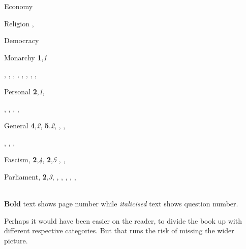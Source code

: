 \documentclass{book}
\begin{document}

\begin{theindex}
 \item Economy
  \subitem
 \item Religion
  ,
 \item Democracy
 \item Monarchy
     \subitem \textbf{1},\textit{1}

\textbf{},\textit{}
\textbf{},\textit{}
\textbf{},\textit{}
\textbf{},\textit{}
\textbf{},\textit{}
\textbf{},\textit{}
\textbf{},\textit{}
\textbf{},\textit{}
 \item Personal
     \subitem \textbf{2},\textit{1},

\textbf{},\textit{}
\textbf{},\textit{}
\textbf{},\textit{}
\textbf{},\textit{}
 \item General
     \subitem \textbf{4},\textit{2}, \textbf{5}.\textit{2},
\textbf{},\textit{}
\textbf{},\textit{}

\textbf{},\textit{}
\textbf{},\textit{}
\textbf{},\textit{}

 \item Fascism,
\subitem \textbf{2},\textit{4}, \textbf{2},\textit{5}
\textbf{},\textit{}
\textbf{},\textit{}
 \item Parliament,
     \subitem \textbf{2},\textit{3}, \textbf{},\textit{}
\textbf{},\textit{}
\textbf{},\textit{}
\textbf{},\textit{}
\textbf{},\textit{}


\indexspace

 \\
\textbf{Bold} text shows page number while \textit{italicised} text shows question number.
\end{theindex}
\newpage
{}
\thispagestyle{plain}
Perhaps it would have been easier on the reader, to divide the book up with different respective categories. But that runs the risk of missing the wider picture.
\end{document}
